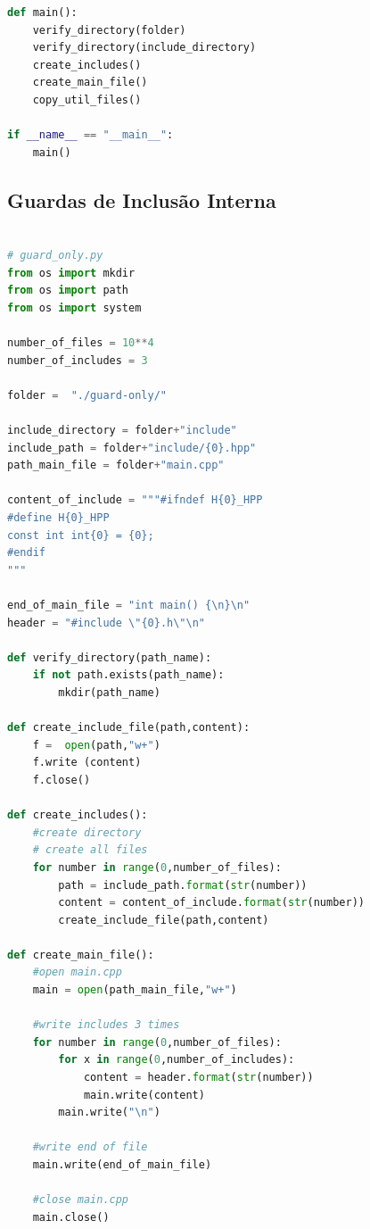 \begin{apendicesenv}
\begin{lstlisting}[language=Python,caption={
            Script Guardas de Inclusão Externa },
                   label=script_external_include]
def main():
    verify_directory(folder)
    verify_directory(include_directory)
    create_includes()
    create_main_file()
    copy_util_files()

if __name__ == "__main__":
    main()
\end{lstlisting}

\subsection{Guardas de Inclusão Interna}
\begin{lstlisting}[language=Python,caption={
              Script Guardas de Inclusão Interna},
                     label=script_intenal_include]
                     
# guard_only.py
from os import mkdir
from os import path
from os import system

number_of_files = 10**4
number_of_includes = 3

folder =  "./guard-only/"

include_directory = folder+"include"
include_path = folder+"include/{0}.hpp"
path_main_file = folder+"main.cpp"

content_of_include = """#ifndef H{0}_HPP
#define H{0}_HPP
const int int{0} = {0};
#endif
"""

end_of_main_file = "int main() {\n}\n"
header = "#include \"{0}.h\"\n"

def verify_directory(path_name):
    if not path.exists(path_name):
        mkdir(path_name)

def create_include_file(path,content):
    f =  open(path,"w+")
    f.write (content)
    f.close()

def create_includes():
    #create directory
    # create all files
    for number in range(0,number_of_files):
        path = include_path.format(str(number))
        content = content_of_include.format(str(number))
        create_include_file(path,content)
    
def create_main_file():
    #open main.cpp
    main = open(path_main_file,"w+")

    #write includes 3 times
    for number in range(0,number_of_files):
        for x in range(0,number_of_includes):
            content = header.format(str(number))
            main.write(content)
        main.write("\n")

    #write end of file
    main.write(end_of_main_file)

    #close main.cpp
    main.close()
                                                                                  

\end{lstlisting}
\end{apendicesenv}
